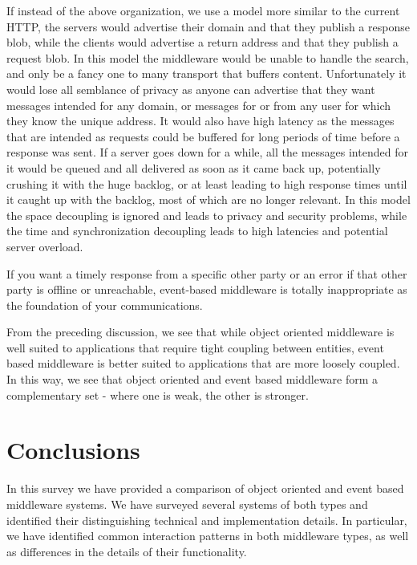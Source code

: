 \documentclass{acm_proc_article-sp}
\begin{document}
If instead of the above organization, we use a model more similar to the current HTTP, the servers would advertise their domain and that they publish a response blob, while the clients would advertise a return address and that they publish a request blob. In this model the middleware would be unable to handle the search, and only be a fancy one to many transport that buffers content. Unfortunately it would lose all semblance of privacy as anyone can advertise that they want messages intended for any domain, or messages for or from any user for which they know the unique address. It would also have high latency as the messages that are intended as requests could be buffered for long periods of time before a response was sent. If a server goes down for a while, all the messages intended for it would be queued and all delivered as soon as it came back up, potentially crushing it with the huge backlog, or at least leading to high response times until it caught up with the backlog, most of which are no longer relevant. In this model the space decoupling is ignored and leads to privacy and security problems, while the time and synchronization decoupling leads to high latencies and potential server overload.

If you want a timely response from a specific other party or an error if that other party is offline or unreachable, event-based middleware is totally inappropriate as the foundation of your communications.

From the preceding discussion, we see that while object oriented middleware is well suited to applications that require tight coupling between entities, event based middleware is better suited to applications that are more loosely coupled. In this way, we see that object oriented and event based middleware form a complementary set - where one is weak, the other is stronger. 



\section{Conclusions}
\label{sec:conclusion}


In this survey we have provided a comparison of object oriented and event based middleware systems. We have surveyed several systems of both types and identified their distinguishing technical and implementation details. In particular, we have identified common interaction patterns in both middleware types, as well as differences in the details of their functionality. 
\end{document}
